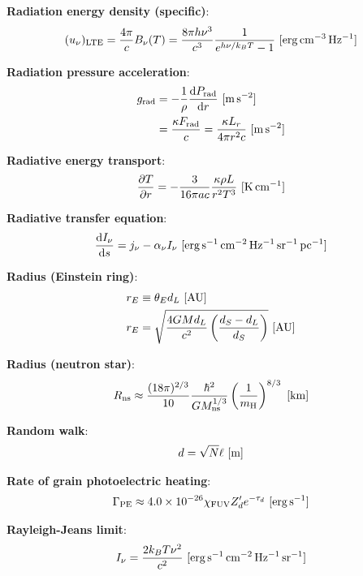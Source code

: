 \documentclass[a4paper,10pt]{article}
\begin{document}
{\noindent}\textbf{Radiation energy density (specific)}:
\begin{align*}
    (u_\nu)_{\rm LTE} = \frac{4\pi}{c}B_\nu(T) = \frac{8\pi h\nu^3}{c^3}\frac{1}{e^{h\nu/k_BT}-1} ~ [{\rm erg\,cm^{-3}\,Hz^{-1}}]
\end{align*}

{\noindent}\textbf{Radiation pressure acceleration}:
\begin{align*}
    g_{\rm rad} &= -\frac{1}{\rho} \frac{{\rm d}P_{\rm rad}}{{\rm d}r} ~ [{\rm m\,s^{-2}}] \\
    &= \frac{\kappa F_{\rm rad}}{c} = \frac{\kappa L_r}{4\pi r^2c} ~ [{\rm m\,s^{-2}}]
\end{align*}

{\noindent}\textbf{Radiative energy transport}:
\begin{align*}
    \frac{\partial T}{\partial r} = - \frac{3}{16\pi ac} \frac{\kappa\rho L}{r^2T^3} ~ [{\rm K\,cm^{-1}}]
\end{align*}

{\noindent}\textbf{Radiative transfer equation}:
\begin{align*}
    \frac{\mathrm{d}I_\nu}{\mathrm{d}s} = j_\nu - \alpha_\nu I_\nu ~ [{\rm erg\,s^{-1}\,cm^{-2}\,Hz^{-1}\,sr^{-1}\,pc^{-1}}]
\end{align*}

{\noindent}\textbf{Radius (Einstein ring)}:
\begin{align*}
    r_E &\equiv \theta_E d_L ~ [{\rm AU}] \\
    r_E &= \sqrt{\frac{4GMd_L}{c^2} \left(\frac{d_S-d_L}{d_S}\right)} ~ [{\rm AU}]
\end{align*}

{\noindent}\textbf{Radius (neutron star)}:
\begin{align*}
    R_{\rm ns} \approx \frac{(18\pi)^{2/3}}{10} \frac{\hbar^2}{GM_{\rm ns}^{1/3}} \left(\frac{1}{m_{\rm H}}\right)^{8/3} ~ [{\rm km}]
\end{align*}

{\noindent}\textbf{Random walk}:
\begin{align*}
    d = \sqrt{N}\ell ~ [{\rm m}]
\end{align*}

{\noindent}\textbf{Rate of grain photoelectric heating}:
\begin{align*}
    \Gamma_{\rm PE} \approx 4.0\times10^{-26}\chi_{\rm FUV}Z_d'e^{-\tau_d} ~ [{\rm erg\,s^{-1}}]
\end{align*}

{\noindent}\textbf{Rayleigh-Jeans limit}:
\begin{align*}
    I_\nu = \frac{2k_BT\nu^2}{c^2} ~ [{\rm erg\,s^{-1}\,cm^{-2}\,Hz^{-1}\,sr^{-1}}]
\end{align*}
\end{document}

